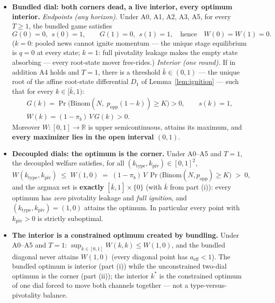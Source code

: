 \begin{restatedproposition}
\leavevmode
\begin{itemize}
\item[(i)] \textbf{Bundled dial: both corners dead, a live interior, every optimum interior.}
\emph{Endpoints (any horizon).} Under A0, A1, A2, A3, A5, for every $T\ge 1$, the bundled game
satisfies
\[
G(0)=0,\ \ s(0)=1,\qquad G(1)=0,\ \ s(1)=1,\quad\text{hence}\quad W(0)=W(1)=0 .
\]
($k=0$: pooled news cannot ignite momentum --- the unique stage equilibrium is $q=0$ at every
state; $k=1$: full pivotality leakage makes the empty state absorbing --- every root-state mover
free-rides.)
\emph{Interior (one round).} If in addition A4 holds and $T=1$, there is a threshold
$\bar k\in(0,1)$ --- the unique root of the affine root-state differential $D_1$ of
Lemma~\ref{lem:ignition} --- such that for every $k\in[\bar k,1)$:
\begin{gather*}
G(k)=\Pr\!\big(\mathrm{Binom}(N,\;p_{\mathrm{opp}}(1-k))\ge K\big)>0,\qquad s(k)=1,\\
W(k)=(1-\pi_b)\,V\,G(k)>0 .
\end{gather*}
Moreover $W:[0,1]\to\mathbb R$ is upper semicontinuous, attains its maximum, and \textbf{every
maximizer lies in the open interval $(0,1)$}.
\item[(ii)] \textbf{Decoupled dials: the optimum is the corner.} Under A0--A5 and $T=1$, the
decoupled welfare satisfies, for all $(k_{\mathrm{type}},k_{\mathrm{piv}})\in[0,1]^2$,
\[
W(k_{\mathrm{type}},k_{\mathrm{piv}})\;\le\;W(1,0)\;=\;(1-\pi_b)\,V\,
\Pr\!\big(\mathrm{Binom}(N,p_{\mathrm{opp}})\ge K\big)\;>\;0,
\]
and the argmax set is \textbf{exactly} $[\bar k,1]\times\{0\}$ (with $\bar k$ from part (i)):
every optimum has \emph{zero} pivotality leakage and \emph{full ignition}, and
$(k_{\mathrm{type}},k_{\mathrm{piv}})=(1,0)$ attains the optimum. In particular every point
with $k_{\mathrm{piv}}>0$ is strictly suboptimal.
\item[(iii)] \textbf{The interior is a constrained optimum created by bundling.} Under A0--A5
and $T=1$: $\sup_{k\in[0,1]}W(k,k)\le W(1,0)$, and the bundled diagonal never attains $W(1,0)$
(every diagonal point has $a_{\mathrm{eff}}<1$). The bundled optimum is interior (part (i))
while the unconstrained two-dial optimum is the corner (part (ii)); the interior $k^*$ is the
constrained optimum of one dial forced to move both channels together --- not a
type-versus-pivotality balance.
\end{itemize}
\end{restatedproposition}

